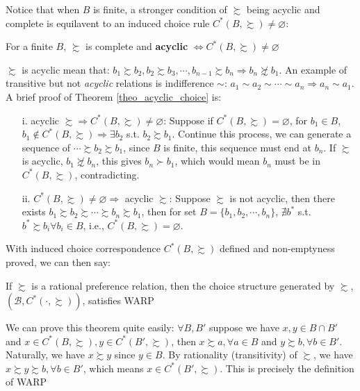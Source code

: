 Notice that when $B$ is finite, a stronger condition of $\succsim$ being acyclic and complete is equilavent to an induced choice rule $C^*(B,\succsim)\neq \varnothing$: 
\begin{theorem}\label{theo_acyclic_choice}
    For a finite $B$, $\succsim$ is complete and \textbf{acyclic} $\Leftrightarrow C^*(B,\succsim)\neq \varnothing$
\end{theorem}
$\succsim$ is acyclic mean that: $b_1\succsim b_2,b_2\succsim b_3,\cdots, b_{n-1}\succsim b_n\Rightarrow b_n\not\succsim b_1$. An example of transitive but not \textit{acyclic} relations is indifference $\sim$: $a_1\sim a_2\sim \cdots\sim a_n\Rightarrow a_n\sim a_1$.
A brief proof of Theorem \ref{theo_acyclic_choice} is:
\begin{enumerate}
    \item[i.] acyclic $\succsim\Rightarrow C^*(B,\succsim)\neq\varnothing$: Suppose if $C^*(B,\succsim)=\varnothing$, for $b_1\in B$, $b_1\notin C^*(B,\succsim)\Rightarrow \exists b_2$ s.t. $b_2\succsim b_1$. Continue this process, we can generate a sequence of $\cdots\succsim b_2\succsim b_1$, since $B$ is finite, this sequence must end at $b_n$. If $\succsim$ is acyclic, $b_1\not\succsim b_n$, this gives $b_n\succ b_1$, which would mean $b_n$ must be in $C^*(B,\succsim)$, contradicting.
    \item[ii.] $C^*(B,\succsim)\neq\varnothing\Rightarrow$ acyclic $\succsim$: Suppose $\succsim$ is not acyclic, then there exists $b_1\succsim b_2\succsim \cdots\succsim b_n\succsim b_1$, then for set $B=\{b_1,b_2,\cdots,b_n\}$, $\nexists b^*$ s.t. $b^*\succsim b_i \forall b_i\in B$, i.e., $C^*(B,\succsim)=\varnothing$.
\end{enumerate}

With induced choice correspondence $C^*(B,\succsim)$ defined and non-emptyness proved, we can then say:
\begin{theorem}
    If $\succsim$ is a rational preference relation, then the choice structure generated by $\succsim$, $(\mathcal{B},C^*(\cdot,\succsim))$, satisfies WARP
\end{theorem}

We can prove this theorem quite easily: $\forall B,B'$ suppose we have $x,y\in B\cap B'$ and $x\in C^*(B,\succsim),y\in C^*(B',\succsim)$, then $x\succsim a, \forall a\in B$ and $y\succsim b,\forall b\in B'$. Naturally, we have $x\succsim y$ since $y\in B$. By rationality (transitivity) of $\succsim$, we have $x\succsim y\succsim b,\forall b\in B'$, which means $x\in C^*(B',\succsim)$. This is precisely the definition of WARP

